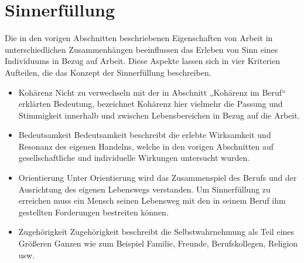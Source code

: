 \section{Sinnerfüllung}
Die in den vorigen Abschnitten beschriebenen Eigenschaften von Arbeit in unterschiedlichen Zusammenhängen beeinflussen das Erleben von Sinn eines Individuums in Bezug auf Arbeit. Diese Aspekte lassen sich in vier Kriterien Aufteilen, die das Konzept der Sinnerfüllung beschreiben. 
\begin{itemize}
    \item Kohärenz\newline
    Nicht zu verwechseln mit der in Abschnitt „Kohärenz im Beruf“ erklärten Bedeutung, bezeichnet Kohärenz hier vielmehr die Passung und Stimmigkeit innerhalb und zwischen Lebensbereichen in Bezug auf die Arbeit.
    \item Bedeutsamkeit\newline
    Bedeutsamkeit beschreibt die erlebte Wirksamkeit und Resonanz des eigenen Handelns, welche in den vorigen Abschnitten auf gesellschaftliche und individuelle Wirkungen untersucht wurden.
    \item Orientierung\newline
    Unter Orientierung wird das Zusammenspiel des Berufs und der Ausrichtung des eigenen Lebenswegs verstanden. Um Sinnerfüllung zu erreichen muss ein Mensch seinen Lebensweg mit den in seinem Beruf ihm gestellten Forderungen bestreiten können.
    \item Zugehörigkeit\newline
    Zugehörigkeit beschreibt die Selbstwahrnehmung als Teil eines Größeren Ganzen wie zum Beispiel Familie, Freunde, Berufskollegen, Religion usw.
\end{itemize}
\cite[S.12]{Schnell.2018}
